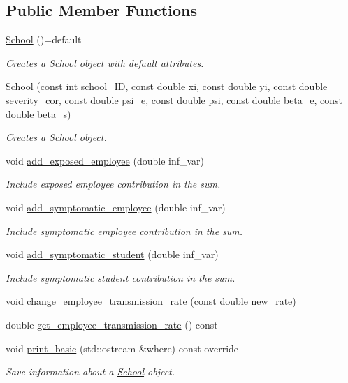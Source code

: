 \subsection*{Public Member Functions}
\begin{DoxyCompactItemize}
\item 
\hyperlink{classSchool_a18efa7137fe6c142ababf7d4ed838a07}{School} ()=default
\begin{DoxyCompactList}\small\item\em Creates a \hyperlink{classSchool}{School} object with default attributes. \end{DoxyCompactList}\item 
\hyperlink{classSchool_a4f9cd6dacc298715885c917b8a14e4ca}{School} (const int school\+\_\+\+ID, const double xi, const double yi, const double severity\+\_\+cor, const double psi\+\_\+e, const double psi, const double beta\+\_\+e, const double beta\+\_\+s)
\begin{DoxyCompactList}\small\item\em Creates a \hyperlink{classSchool}{School} object. \end{DoxyCompactList}\item 
void \hyperlink{classSchool_aa3d7bde17fc920efc33f3152f3df5671}{add\+\_\+exposed\+\_\+employee} (double inf\+\_\+var)
\begin{DoxyCompactList}\small\item\em Include exposed employee contribution in the sum. \end{DoxyCompactList}\item 
void \hyperlink{classSchool_aaa75cfbde33ca728de63c9d6f72b1ff8}{add\+\_\+symptomatic\+\_\+employee} (double inf\+\_\+var)
\begin{DoxyCompactList}\small\item\em Include symptomatic employee contribution in the sum. \end{DoxyCompactList}\item 
void \hyperlink{classSchool_ac5457e1834cbf399c4c9ad8a6971673f}{add\+\_\+symptomatic\+\_\+student} (double inf\+\_\+var)
\begin{DoxyCompactList}\small\item\em Include symptomatic student contribution in the sum. \end{DoxyCompactList}\item 
void \hyperlink{classSchool_aba41cef9af3f2cb98bf1075c289baf84}{change\+\_\+employee\+\_\+transmission\+\_\+rate} (const double new\+\_\+rate)
\item 
double \hyperlink{classSchool_a7cc6659bce874d0cc56ed45972c7d842}{get\+\_\+employee\+\_\+transmission\+\_\+rate} () const
\item 
void \hyperlink{classSchool_ade1610f7c072eb041f6d8b0e157e1cc8}{print\+\_\+basic} (std\+::ostream \&where) const override
\begin{DoxyCompactList}\small\item\em Save information about a \hyperlink{classSchool}{School} object. \end{DoxyCompactList}\end{DoxyCompactItemize}
